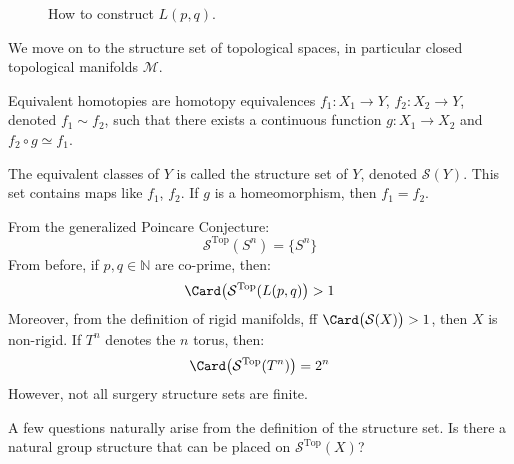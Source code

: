 \documentclass{book}                                                           %
\begin{document}
            \begin{figure}[H]
                \centering
                \captionsetup{type=figure}
                
                \caption{How to construct $L(p,q)$.}
                \label{fig:surgery_theory_lens_space_drawing}
            \end{figure}
            We move on to the structure set of topological spaces,
            in particular closed topological
            manifolds $\mathcal{M}$.
            \begin{definition}
                Equivalent homotopies are homotopy equivalences
                $f_{1}:X_{1}\rightarrow Y$,
                $f_{2}:X_{2}\rightarrow Y$,
                denoted $f_{1}\sim{f_{2}}$, such that there
                exists a continuous function
                $g:X_{1}\rightarrow{X_{2}}$ and
                $f_{2}\circ{g}\simeq{f_{1}}$.
            \end{definition}
            The equivalent classes of $Y$ is called the
            structure set of $Y$,
            denoted $\mathcal{S}(Y)$. This set contains maps
            like $f_{1}$, $f_{2}$.
            If $g$ is a homeomorphism, then $f_{1}=f_{2}$.
            \begin{lexample}{}{}
                From the generalized Poincare Conjecture:
                \begin{equation}
                    \mathcal{S}^{\textrm{Top}}(S^{n})
                    =\{S^{n}\}
                \end{equation}
                From before, if $p,q\in\mathbb{N}$ are co-prime, then:
                \begin{equation}
                    \Card\big(\mathcal{S}^{\textrm{Top}}(L(p,q)\big)>1
                \end{equation}
                Moreover, from the definition of rigid manifolds,
                ff $\Card\big(\mathcal{S}(X)\big)>1$, then $X$ is non-rigid.
                If $T^{n}$ denotes the $n$ torus, then:
                \begin{equation}
                    \Card\big(\mathcal{S}^{\textrm{Top}}(T^{n})\big)
                    =2^{n}
                \end{equation}
                However, not all surgery structure sets are finite.
            \end{lexample}
            A few questions naturally arise from the
            definition of the structure set. Is there a natural group
            structure that can be placed on $\mathcal{S}^{\textrm{Top}}(X)$?
\end{document}
